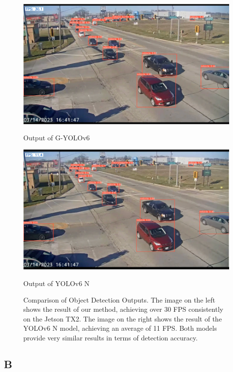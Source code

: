 \begin{figure}[htbp]
    \centering
    \begin{minipage}[b]{0.45\textwidth}
        \centering
        \includegraphics[width=\textwidth]{figures/Picture1.png}
        \caption{Output of G-YOLOv6}
        \label{fig:our_method}
    \end{minipage}
    \hfill
    \begin{minipage}[b]{0.45\textwidth}
        \centering
        \includegraphics[width=\textwidth]{figures/Picture2.png}
        \caption{Output of YOLOv6 N}
        \label{fig:yolov6}
    \end{minipage}
    \caption{Comparison of Object Detection Outputs. The image on the left shows the result of our method, achieving over 30 FPS consistently on the Jetson TX2. The image on the right shows the result of the YOLOv6 N model, achieving an average of 11 FPS. Both models provide very similar results in terms of detection accuracy.}
    \label{fig:comparison}
\end{figure}

\clearpage

\subsection*{B}

\clearpage
